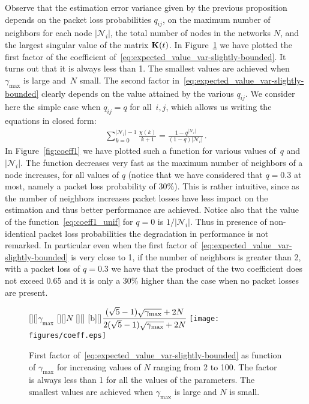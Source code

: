 \documentclass[a4paper,notitlepage,onecolumn]{article}
\def\K{{\cal K}}
\def\K{{\bf K}}
\numberwithin{equation}{section}
\begin{document}
Observe that the estimation error variance given by the previous
proposition depends on the packet loss probabilities $q_{ij}$, on
the maximum number of neighbors for each node $|\mathcal{N}_{i}|$,
the total number of nodes in the networks $N$, and the largest
singular value of the matrix $\K(t)$. In
Figure~\ref{fig:e_phi_e_v_q} we have plotted the first factor of
the coefficient of~\eqref{eq:expected_value_var-slightly-bounded}.
It turns out that it is always less than 1. The smallest values
are achieved when $\gamma_{\max}$ is large and~$N$ small. The
second factor in~\eqref{eq:expected_value_var-slightly-bounded}
clearly depends on the value attained by the various $q_{ij}$. We
consider here the simple case when $q_{ij}=q$ for all~$i,j$, which
allows us writing the equations in closed form:
\begin{align}
    \sum_{k = 0}^{|\mathcal{N}_{i}|-1} \frac{\chi(k)}{k+1} = \frac{1-q^{|\mathcal{N}_{i}|}}{(1-q)|\mathcal{N}_{i}|}\,.
    \label{eq:coeff1_unif}
\end{align}
In Figure~\ref{fig:coeff1} we have plotted such a function for
various values of~$q$ and $|\mathcal{N}_{i}|$. The function
decreases very fast as the maximum number of neighbors of a node
increases, for all values of $q$ (notice that we have considered
that $q=0.3$ at most, namely a packet loss probability of 30\%).
This is rather intuitive, since as the number of neighbors
increases packet losses have less impact on the estimation and
thus better performance are achieved. Notice also that the value
of the function~\eqref{eq:coeff1_unif} for $q=0$ is
$1/|\mathcal{N}_{i}|$. Thus in presence of non-identical packet
loss probabilities the degradation in performance is not remarked.
In particular even when the first factor
of~\eqref{eq:expected_value_var-slightly-bounded} is very close to
1, if the number of neighbors is greater than 2, with a packet
loss of $q=0.3$ we have that the product of the two coefficient
does not exceed 0.65 and it is only a 30\% higher than the case
when no packet losses are present.
\begin{figure}
    \centering
    [][]{$\gamma_{\max}$}
    [][]{$N$}
    [][]{}
    [b][]{$\cfrac{(\sqrt{5}-1)\sqrt{\gamma_{\max}}+2N}{2(\sqrt{5}-1)\sqrt{\gamma_{\max}}+2N}$}
    \texttt{[image: figures/coeff.eps]}
\caption{First factor of~\eqref{eq:expected_value_var-slightly-bounded} as function of $\gamma_{\max}$ for increasing values of $N$ ranging from 2 to 100.
    The factor is always less than 1 for all the values of the parameters. The smallest values are achieved when $\gamma_{\max}$ is large and $N$ is small.
}\label{fig:e_phi_e_v_q}
\end{figure}
\end{document}
